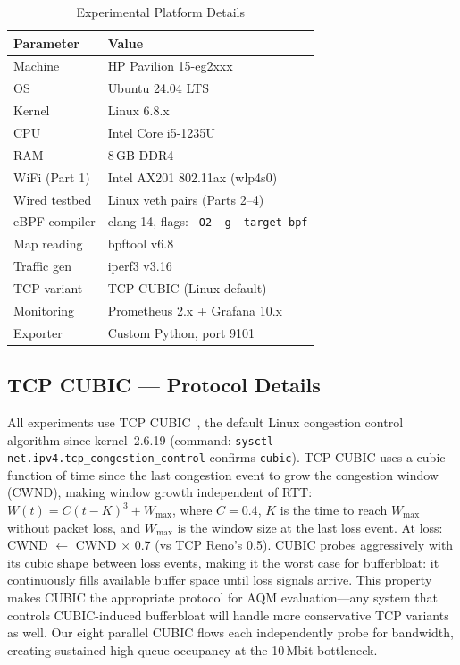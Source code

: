 \documentclass[conference]{IEEEtran}
\begin{document}
\begin{table}[h]
\centering
\caption{Experimental Platform Details}
\label{tab:platform}
\scriptsize
\begin{tabular}{ll}
\toprule
\textbf{Parameter} & \textbf{Value} \\
\midrule
Machine         & HP Pavilion 15-eg2xxx \\
OS              & Ubuntu 24.04 LTS \\
Kernel          & Linux 6.8.x \\
CPU             & Intel Core i5-1235U \\
RAM             & 8\,GB DDR4 \\
WiFi (Part 1)   & Intel AX201 802.11ax (wlp4s0) \\
Wired testbed   & Linux veth pairs (Parts 2--4) \\
eBPF compiler   & clang-14, flags: \texttt{-O2 -g -target bpf} \\
Map reading     & bpftool v6.8 \\
Traffic gen     & iperf3 v3.16 \\
TCP variant     & TCP CUBIC (Linux default) \\
Monitoring      & Prometheus 2.x + Grafana 10.x \\
Exporter        & Custom Python, port 9101 \\
\bottomrule
\end{tabular}
\end{table}

\subsection{TCP CUBIC --- Protocol Details}

All experiments use TCP CUBIC~\cite{cubic2008}, the default Linux congestion
control algorithm since kernel~2.6.19 (command:
\texttt{sysctl net.ipv4.tcp\_congestion\_control} confirms \texttt{cubic}).
TCP CUBIC uses a cubic function of time since the last congestion event to grow
the congestion window (CWND), making window growth independent of RTT:
$W(t) = C(t - K)^3 + W_{\max}$, where $C=0.4$, $K$ is the time to reach
$W_{\max}$ without packet loss, and $W_{\max}$ is the window size at the last
loss event. At loss: CWND $\leftarrow$ CWND $\times$ 0.7 (vs TCP Reno's 0.5).
CUBIC probes aggressively with its cubic shape between loss events, making it
the worst case for bufferbloat: it continuously fills available buffer space
until loss signals arrive. This property makes CUBIC the appropriate protocol
for AQM evaluation---any system that controls CUBIC-induced bufferbloat will
handle more conservative TCP variants as well. Our eight parallel CUBIC flows
each independently probe for bandwidth, creating sustained high queue occupancy
at the 10\,Mbit bottleneck.
\end{document}
